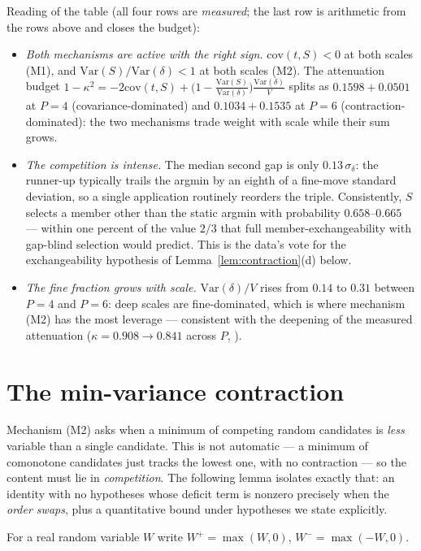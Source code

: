 \documentclass[11pt]{article}
\theoremstyle{definition}
\theoremstyle{remark}
\newcommand{\Var}{\mathrm{Var}}
\newcommand{\cov}{\mathrm{cov}}
\newcommand{\kap}{\kappa}
\newcommand{\dl}{\delta}
\begin{document}
\noindent Reading of the table (all four rows are \emph{measured}; the
last row is arithmetic from the rows above and closes the budget):

\begin{itemize}
\item \emph{Both mechanisms are active with the right sign.}
$\cov(t,S) < 0$ at both scales (M1), and $\Var(S)/\Var(\dl) < 1$ at both
scales (M2). The attenuation budget
$1 - \kap^2 = -2\cov(t,S) + \big(1 - \tfrac{\Var(S)}{\Var(\dl)}\big)
\tfrac{\Var(\dl)}{V}$
splits as $0.1598 + 0.0501$ at $P = 4$ (covariance-dominated) and
$0.1034 + 0.1535$ at $P = 6$ (contraction-dominated): the two mechanisms
trade weight with scale while their sum grows.
\item \emph{The competition is intense.} The median second gap is only
$0.13\,\sigma_\dl$: the runner-up typically trails the argmin by an
eighth of a fine-move standard deviation, so a single application
routinely reorders the triple. Consistently, $S$ selects a member other
than the static argmin with probability $0.658$--$0.665$ --- within one
percent of the value $2/3$ that full member-exchangeability with
gap-blind selection would predict. This is the data's vote for the
exchangeability hypothesis of Lemma~\ref{lem:contraction}(d) below.
\item \emph{The fine fraction grows with scale.} $\Var(\dl)/V$ rises
from $0.14$ to $0.31$ between $P = 4$ and $P = 6$: deep scales are
fine-dominated, which is where mechanism (M2) has the most leverage ---
consistent with the deepening of the measured attenuation
($\kap = 0.908 \to 0.841$ across $P$, \cite{Drift26}).
\end{itemize}

\section{The min-variance contraction}
\label{sec:contraction}

Mechanism (M2) asks when a minimum of competing random candidates is
\emph{less} variable than a single candidate. This is not automatic ---
a minimum of comonotone candidates just tracks the lowest one, with no
contraction --- so the content must lie in \emph{competition}. The
following lemma isolates exactly that: an identity with no hypotheses
whose deficit term is nonzero precisely when the \emph{order swaps},
plus a quantitative bound under hypotheses we state explicitly.

For a real random variable $W$ write $W^+ = \max(W, 0)$,
$W^- = \max(-W, 0)$.
\end{document}
